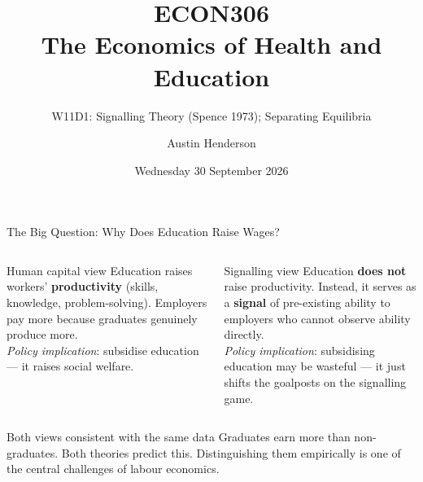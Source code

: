 \documentclass[aspectratio=169, 12pt]{beamer}
\title[ECON306: W11D1 — Signalling Theory]{ECON306\\The Economics of Health and Education}
\subtitle{W11D1: Signalling Theory (Spence 1973); Separating Equilibria}
\author{Austin Henderson}
\institute{Department of Economics\\University of Otago}
\date{Wednesday 30 September 2026}
\begin{document}
\begin{frame}[plain]
  \titlepage
\end{frame}



\begin{frame}{The Big Question: Why Does Education Raise Wages?}
  \begin{columns}
      \begin{block}{Human capital view}
        \small Education raises workers' \textbf{productivity} (skills, knowledge, problem-solving).
        Employers pay more because graduates genuinely produce more.\\[0.2em]
        \textit{Policy implication}: subsidise education --- it raises social welfare.
      \end{block}
      \begin{alertblock}{Signalling view}
        \small Education \textbf{does not} raise productivity. Instead, it serves as a \textbf{signal}
        of pre-existing ability to employers who cannot observe ability directly.\\[0.2em]
        \textit{Policy implication}: subsidising education may be wasteful --- it just
        shifts the goalposts on the signalling game.
      \end{alertblock}
  \end{columns}
  \vspace{0.2em}
  \begin{exampleblock}{Both views consistent with the same data}
    \small Graduates earn more than non-graduates. Both theories predict this. Distinguishing them
    empirically is one of the central challenges of labour economics.
  \end{exampleblock}
\end{frame}
\end{document}
